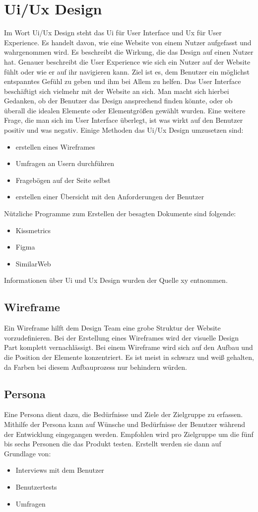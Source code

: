 \section{Ui/Ux Design}
Im Wort Ui/Ux Design steht das Ui für User Interface und Ux für User Experience. Es handelt davon, wie eine Website von einem Nutzer aufgefasst und wahrgenommen wird. Es beschreibt die Wirkung, die das Design auf einen Nutzer hat. Genauer beschreibt die User Experience wie sich ein Nutzer auf der Website fühlt oder wie er auf ihr navigieren kann. 
Ziel ist es, dem Benutzer ein möglichst entspanntes Gefühl zu geben und ihm bei Allem zu helfen. Das User Interface beschäftigt sich vielmehr mit der Website an sich. Man macht sich hierbei Gedanken, ob der Benutzer das Design ansprechend finden könnte, oder ob überall die idealen Elemente oder Elementgrößen gewählt wurden. Eine weitere Frage, die man sich im User Interface überlegt, ist was wirkt auf den Benutzer positiv und was negativ. Einige Methoden das Ui/Ux Design umzusetzen sind: 

\begin{itemize}
	\item erstellen eines Wireframes 
	\item Umfragen an Usern durchführen
	\item Fragebögen auf der Seite selbst 
	\item erstellen einer Übersicht mit den Anforderungen der Benutzer
\end{itemize}
Nützliche Programme zum Erstellen der besagten Dokumente  sind folgende: 
\begin{itemize}
	\item Kissmetrics
	\item Figma
	\item SimilarWeb
\end{itemize}
Informationen über Ui und Ux Design wurden der Quelle xy entnommen.

\subsection{Wireframe}
Ein Wireframe hilft dem Design Team eine grobe Struktur der Website vorzudefinieren. Bei der Erstellung eines Wireframes wird der visuelle Design Part komplett vernachlässigt. Bei einem Wireframe wird sich auf den Aufbau und die Position der Elemente konzentriert. Es ist meist in schwarz und weiß gehalten, da Farben bei diesem Aufbauprozess nur behindern würden. 
\subsection{Persona}
Eine Persona dient dazu, die Bedürfnisse und Ziele der Zielgruppe zu erfassen. Mithilfe der Persona kann auf Wünsche und Bedürfnisse der Benutzer während der Entwicklung eingegangen werden. Empfohlen wird pro Zielgruppe um die fünf bis sechs Personen die das Produkt testen. Erstellt werden sie dann auf Grundlage von:
\begin{itemize}
	\item Interviews mit dem Benutzer
	\item Benutzertests
	\item Umfragen
\end{itemize}

